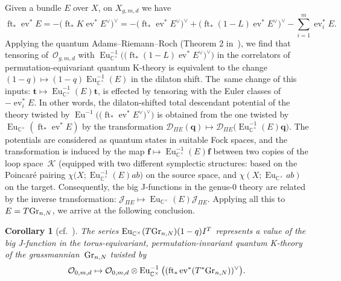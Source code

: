 \documentclass[pdftex]{sigma}
\numberwithin{equation}{section}
\newtheorem{Corollary}[Theorem]{Corollary}
\def\D{\mathcal D}
\def\K{\mathcal K}
\def\J{\mathcal J}
\def\O{\mathcal O}
\def\CC{\mathbb C}
\def\f{{\mathbf f}}
\def\t{{\mathbf t}}
\def\q{{\mathbf q}}
\def\ev{\operatorname{ev}}
\def\ft{\operatorname{ft}}
\def\Eu{\operatorname{Eu}}
\begin{document}
Given a bundle $E$ over $X$, on $X_{g,m,d}$ we have
\[
\ft_*\ev^*E=-\big(\ft_* K\ev^*E^{\vee}\big)^{\vee} = -\big(\ft_*\ev^*E^{\vee}\big)^{\vee}+\big(\ft_*(1-L)\ev^*E^{\vee}\big)^{\vee}-\sum_{i=1}^m\ev_i^*E.
\]
Applying the quantum Adams--Riemann--Roch (Theorem 2 in~\cite{Givental:perm11}), we find that tensoring of~$\O_{g,m,d}$ with $\Eu^{-1}_{\CC^{\times}}\big(\big(\ft_*(1-L)\ev^*E^{\vee}\big)^{\vee}\big)$ in the correlators of permutation-equivariant quantum K-theory is equivalent to the change $(1-q) \mapsto (1-q)\Eu_{\CC^{\times}}^{-1}(E)$ in the dilaton shift. The~same change of this inputs: $\t \mapsto \Eu^{-1}_{\CC^{\times}}(E)\t$, is effected by tensoring with the Euler classes of~$-\ev_i^*E$. In other words, the dilaton-shifted total descendant potential of the theory twisted by $\Eu^{-1}\big(\big(\ft_*\ev^*E^{\vee}\big)^{\vee}\big)$ is obtained from the one twisted by $\Eu_{\CC^{\times}}(\ft_*\ev^*E)$ by the transformation $\D_{\Pi E}(\q) \mapsto \D_{\Pi E} \big(\Eu^{-1}_{\CC^{\times}}(E)\q\big)$. The potentials are considered as quantum states in suitable Fock spaces, and the transformation is induced by the map $\f \mapsto \Eu^{-1}_{\CC^{\times}}(E)\f$ between two copies of the loop space~$\K$ (equipped with two different symplectic structures: based on the Poincar\'e pairing $\chi \big(X; \Eu_{\CC^{\times}}^{-1}(E) ab\big)$ on the source space, and $\chi (X;\Eu_{\CC^{\times}}ab)$ on the target. Consequently, the big \mbox{J-functions} in the genus-$0$ theory are related by the inverse transformation: $\J_{\Pi E}\mapsto \Eu_{\CC^{\times}}(E)\J_{\Pi E}$. Applying all this to $E=T{\rm Gr}_{n,N}$, we arrive at the following conclusion.

\begin{Corollary}[{cf.~\cite{Liu}}] \label{cor2}
The series $\Eu_{\CC^{\times}}(T{\rm Gr}_{n,N})(1-q)I^T$ represents a value of the big J-func\-tion in the torus-equivariant, permutation-invariant quantum K-theory of the grassmannian~${\rm Gr}_{n,N}$ twisted by
\[
\O_{0,m,d}\mapsto \O_{0,m,d}\otimes \Eu^{-1}_{\CC^{\times}}\big((\ft_*\ev^*(T^*{\rm Gr}_{n,N}))^{\vee}\big).
\]
\end{Corollary}
\end{document}

